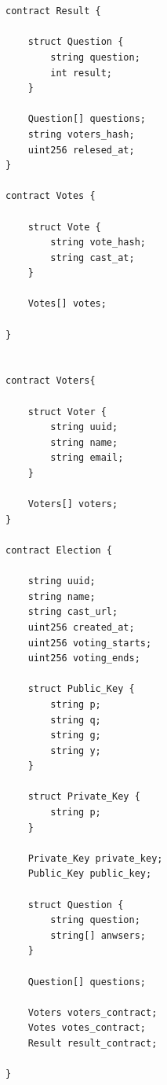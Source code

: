 \documentclass{ufsctex/ufsctex}
\begin{document}
\begin{lstlisting}[language=Solidity]


contract Result {

    struct Question {
        string question;
        int result;
    }

    Question[] questions;
    string voters_hash;
    uint256 relesed_at;
}

contract Votes {

    struct Vote {
        string vote_hash;
        string cast_at;
    }

    Votes[] votes;

}


contract Voters{

    struct Voter {
        string uuid;
        string name;
        string email;
    }

    Voters[] voters;
}

contract Election {

    string uuid;
    string name;
    string cast_url;
    uint256 created_at;
    uint256 voting_starts;
    uint256 voting_ends;

    struct Public_Key {
        string p;
        string q;
        string g;
        string y;
    }

    struct Private_Key {
        string p;
    }

    Private_Key private_key;
    Public_Key public_key;

    struct Question {
        string question;
        string[] anwsers;
    }

    Question[] questions;

    Voters voters_contract;
    Votes votes_contract;
    Result result_contract;

}

\end{lstlisting}



\end{document}
